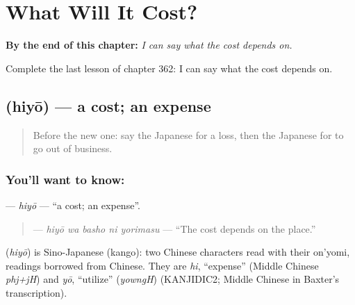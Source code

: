 
\chapter{What Will It Cost?}
\label{ch:ja-what-will-it-cost}

\begin{chapteropening}
\textbf{By the end of this chapter:} \emph{I can say what the cost depends on.}

Complete the last lesson of chapter 362: I can say what the cost depends on.
\end{chapteropening}

\section[\texorpdfstring{\ja{ひよう} (hiyō)}{ひよう (hiyō)}]{ (hiyō) — a cost; an expense}

\label{lesson:JA-C362-hiyou}



\begin{quote}
Before the new one: say the Japanese for a loss, then the Japanese for to go out of business.
\end{quote}

\subsection*{You'll want to know: }
\textbf{} — \emph{hiyō} — \textquotedblleft{}a cost; an expense\textquotedblright{}.

\begin{quote}
\textbf{  } — \emph{hiyō wa basho ni yorimasu} — \textquotedblleft{}The cost depends on the place.\textquotedblright{}
\end{quote}

\begin{cousinweb}
\textbf{} (\emph{hiyō}) is Sino-Japanese (kango): two Chinese characters read with their on'yomi, readings borrowed from Chinese. They are \emph{hi}, \textquotedblleft{}expense\textquotedblright{} (Middle Chinese \emph{phj+jH}) and \emph{yō}, \textquotedblleft{}utilize\textquotedblright{} (\emph{yowngH}) (KANJIDIC2; Middle Chinese in Baxter's transcription).
\end{cousinweb}

